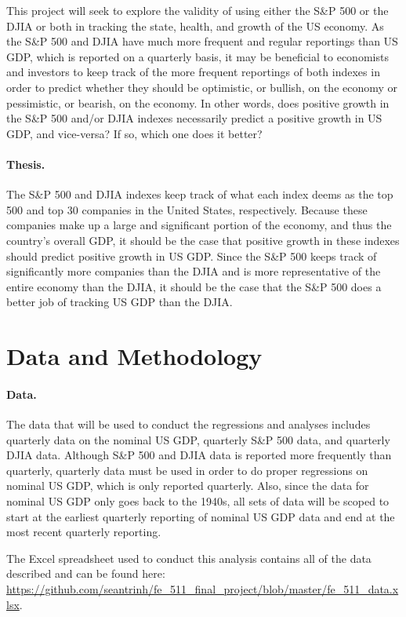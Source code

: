 \documentclass[11pt]{article}
\numberwithin{equation}{section}
\begin{document}
This project will seek to explore the validity of using either the S\&P 500 or the DJIA or both in tracking the state, health, and growth of the US economy. As the S\&P 500 and DJIA have much more frequent and regular reportings than US GDP, which is reported on a quarterly basis, it may be beneficial to economists and investors to keep track of the more frequent reportings of both indexes in order to predict whether they should be optimistic, or bullish, on the economy or pessimistic, or bearish, on the economy. In other words, does positive growth in the S\&P 500 and/or DJIA indexes necessarily predict a positive growth in US GDP, and vice-versa? If so, which one does it better?

\paragraph{Thesis.}
The S\&P 500 and DJIA indexes keep track of what each index deems as the top 500 and top 30 companies in the United States, respectively. Because these companies make up a large and significant portion of the economy, and thus the country's overall GDP, it should be the case that positive growth in these indexes should predict positive growth in US GDP. Since the S\&P 500 keeps track of significantly more companies than the DJIA and is more representative of the entire economy than the DJIA, it should be the case that the S\&P 500 does a better job of tracking US GDP than the DJIA.

\section{Data and Methodology}

\paragraph{Data.} 
The data that will be used to conduct the regressions and analyses includes quarterly data on the nominal US GDP, quarterly S\&P 500 data, and quarterly DJIA data. Although S\&P 500 and DJIA data is reported more frequently than quarterly, quarterly data must be used in order to do proper regressions on nominal US GDP, which is only reported quarterly. Also, since the data for nominal US GDP only goes back to the 1940s, all sets of data will be scoped to start at the earliest quarterly reporting of nominal US GDP data and end at the most recent quarterly reporting.

The Excel spreadsheet used to conduct this analysis contains all of the data described and can be found here: \url{https://github.com/seantrinh/fe_511_final_project/blob/master/fe_511_data.xlsx}.
\end{document}
